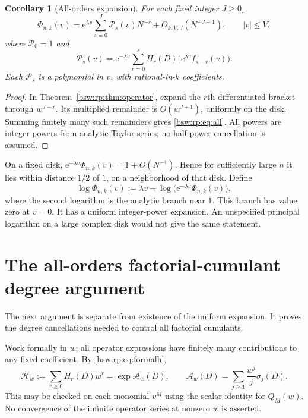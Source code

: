 \documentclass[11pt,letterpaper]{article}
\newtheorem{corollary}[theorem]{Corollary}
\theoremstyle{definition}
\theoremstyle{remark}
\newcommand{\ee}{\mathrm e}
\begin{document}
\begin{corollary}[All-orders expansion]\label{bsw:rp:cor:all}
For each fixed integer $J\ge0$,
\begin{equation}\label{bsw:rp:eq:all}
 \Phi_{n,k}(v)=\ee^{\lambda v}\sum_{s=0}^J \mathcal P_s(v)N^{-s}
 +O_{k,V,J}(N^{-J-1}),\qquad |v|\le V,
\end{equation}
where $\mathcal P_0=1$ and
\begin{equation}\label{bsw:rp:eq:Ps}
 \mathcal P_s(v)=\ee^{-\lambda v}\sum_{r=0}^s
 H_r(D)\bigl(\ee^{\lambda v}f_{s-r}(v)\bigr).
\end{equation}
Each $\mathcal P_s$ is a polynomial in $v$, with rational-in-$k$
coefficients.
\end{corollary}

\begin{proof}
In Theorem~\ref{bsw:rp:thm:operator}, expand the $r$th differentiated
bracket through $w^{J-r}$.  Its multiplied remainder is $O(w^{J+1})$,
uniformly on the disk.  Summing finitely many such remainders gives
\eqref{bsw:rp:eq:all}.  All powers are integer powers from analytic Taylor
series; no half-power cancellation is assumed.
\end{proof}

On a fixed disk, $\ee^{-\lambda v}\Phi_{n,k}(v)=1+O(N^{-1})$.  Hence for
sufficiently large $n$ it lies within distance $1/2$ of $1$, on a
neighborhood of that disk.  Define
\begin{equation}\label{bsw:rp:eq:logbranch}
 \log\Phi_{n,k}(v):=\lambda v+\log\bigl(\ee^{-\lambda v}\Phi_{n,k}(v)\bigr),
\end{equation}
where the second logarithm is the analytic branch near $1$.  This branch has
value zero at $v=0$.  It has a uniform integer-power expansion.  An
unspecified principal logarithm on a large complex disk would not give the
same statement.

\section{The all-orders factorial-cumulant degree argument}\label{bsw:rp:sec:cumulant}

The next argument is separate from existence of the uniform expansion.  It
proves the degree cancellations needed to control all factorial cumulants.

Work formally in $w$; all operator expressions have finitely many
contributions to any fixed coefficient.  By \eqref{bsw:rp:eq:formalh},
\begin{equation}\label{bsw:rp:eq:Tw}
 \mathcal H_w:=\sum_{r\ge0}H_r(D)w^r=\exp\mathcal A_w(D),
 \qquad \mathcal A_w(D)=\sum_{j\ge1}\frac{w^j}{j}\sigma_j(D).
\end{equation}
This may be checked on each monomial $v^M$ using the scalar identity for
$Q_M(w)$.  No convergence of the infinite operator series at nonzero $w$ is
asserted.
\end{document}
